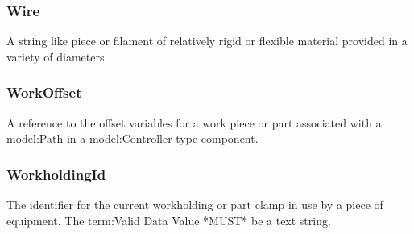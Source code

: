 \subsubsection{Wire}
  \label{sec:Wire}


A string like piece or filament of relatively rigid or flexible material provided in a variety of diameters.

\FloatBarrier

\subsubsection{WorkOffset}
  \label{sec:WorkOffset}


A reference to the offset variables for a work piece or part associated with a {model:Path} in a {model:Controller} type component.

\FloatBarrier

\subsubsection{WorkholdingId}
  \label{sec:WorkholdingId}


The identifier for the current workholding or part clamp in use by a piece of equipment. 
 The {term:Valid Data Value} *MUST* be a text string.

\FloatBarrier
